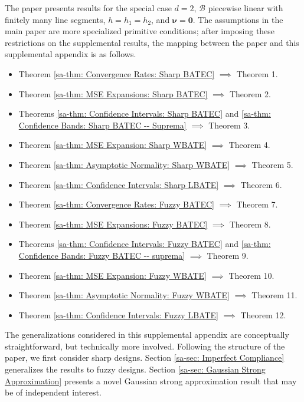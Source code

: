 \documentclass[10pt]{article}
\newcommand{\bnu}{\boldsymbol{\nu}}
\newcommand{\B}{\mathcal{B}}
\begin{document}
The paper presents results for the special case $d=2$, $\B$ piecewise linear with finitely many line segments, $h=h_1=h_2$, and $\bnu=\mathbf{0}$. The assumptions in the main paper are more specialized primitive conditions; after imposing these restrictions on the supplemental results, the mapping between the paper and this supplemental appendix is as follows.
\begin{itemize}%
    \item Theorem \ref{sa-thm: Convergence Rates: Sharp BATEC} $\implies$ Theorem 1.
    \item Theorem \ref{sa-thm: MSE Expansions: Sharp BATEC} $\implies$ Theorem 2.
    \item Theorems \ref{sa-thm: Confidence Intervals: Sharp BATEC} and \ref{sa-thm: Confidence Bands: Sharp BATEC -- Suprema} $\implies$ Theorem 3.
    \item Theorem \ref{sa-thm: MSE Expansion: Sharp WBATE} $\implies$ Theorem 4.
    \item Theorem \ref{sa-thm: Asymptotic Normality: Sharp WBATE} $\implies$ Theorem 5.
    \item Theorem \ref{sa-thm: Confidence Intervals: Sharp LBATE} $\implies$ Theorem 6.
    \item Theorem \ref{sa-thm: Convergence Rates: Fuzzy BATEC} $\implies$ Theorem 7.
    \item Theorem \ref{sa-thm: MSE Expansions: Fuzzy BATEC} $\implies$ Theorem 8.
    \item Theorems \ref{sa-thm: Confidence Intervals: Fuzzy BATEC} and \ref{sa-thm: Confidence Bands: Fuzzy BATEC -- suprema} $\implies$ Theorem 9.
    \item Theorem \ref{sa-thm: MSE Expansion: Fuzzy WBATE} $\implies$ Theorem 10.
    \item Theorem \ref{sa-thm: Asymptotic Normality: Fuzzy WBATE} $\implies$ Theorem 11.
    \item Theorem \ref{sa-thm: Confidence Intervals: Fuzzy LBATE} $\implies$ Theorem 12.
\end{itemize}

The generalizations considered in this supplemental appendix are conceptually straightforward, but technically more involved. Following the structure of the paper, we first consider sharp designs. Section \ref{sa-sec: Imperfect Compliance} generalizes the results to fuzzy designs. Section \ref{sa-sec: Gaussian Strong Approximation} presents a novel Gaussian strong approximation result that may be of independent interest.
\end{document}
